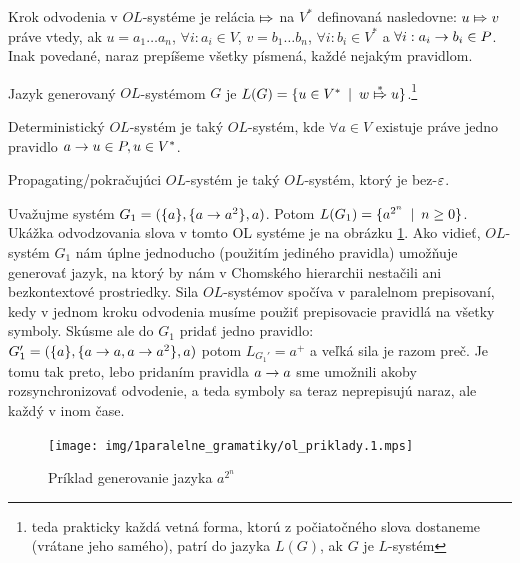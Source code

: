 \begin{definicia}
    Krok odvodenia v $OL$-systéme je relácia $\Mapsto$ na $V^{*}$ definovaná
    nasledovne: $u\Mapsto v$ práve vtedy, ak $u=a_{1} \dots a_{n}$,
    $\forall i: a_{i} \in V$, $v=b_{1} \dots b_{n}$, 
    $\forall i: b_{i} \in V^{*}$ a 
    $\forall i: a_{i} \rightarrow b_{i} \in P$. 
    Inak povedané, naraz prepíšeme všetky písmená, každé nejakým
    pravidlom.
\end{definicia}

\begin{definicia}
    Jazyk generovaný $OL$-systémom $G$ je 
    $L(G)=\{u\in V^{*} \enspace |\enspace w \overset{*}{\Mapsto} u\}$.\footnote{teda prakticky
        každá vetná forma, ktorú z
        počiatočného slova dostaneme (vrátane jeho samého), patrí do
        jazyka $L(G)$, ak $G$ je $L$-systém
        }
\end{definicia}

\begin{definicia}
    Deterministický $OL$-systém je taký $OL$-systém,
    kde $\forall a\in V$ existuje práve jedno pravidlo
    $a \rightarrow u\in P, u\in V^*$.
\end{definicia}

\begin{definicia}
    Propagating/pokračujúci $OL$-systém je taký $OL$-systém, ktorý
    je bez-$\varepsilon$.
\end{definicia}

\begin{priklad}
    Uvažujme systém $G_1=(\{ a \},\{ a \rightarrow a^2\}, a)$.
    Potom $L(G_1)=\{ a^{2^n} \enspace |\enspace n \ge 0\}$.
    Ukážka odvodzovania slova v tomto OL systéme je na obrázku 
    \ref{img:ol_priklad_1}.
    Ako vidieť, $OL$-systém $G_1$ nám úplne jednoducho 
    (použitím jediného pravidla) umožňuje
    generovať jazyk, na ktorý by nám v Chomského hierarchii
    nestačili ani bezkontextové prostriedky.
    Sila $OL$-systémov spočíva v paralelnom prepisovaní,
    kedy v jednom kroku odvodenia
    musíme použiť prepisovacie pravidlá na všetky symboly.
    Skúsme ale do $G_1$ pridať jedno pravidlo:\\
    $G_{1}'=(\{ a \},\{ a\rightarrow a,
    a \rightarrow a^2 \}, a)$ potom $L_{G_1'}=a^{+}$ a veľká sila je razom
    preč. Je tomu tak preto, lebo pridaním pravidla $a\rightarrow a$ sme
    umožnili akoby rozsynchronizovať odvodenie, a teda symboly sa
    teraz neprepisujú naraz, ale každý v inom čase.

    \begin{figure}[htp]
        \centering
        \texttt{[image: img/1paralelne\_gramatiky/ol\_priklady.1.mps]}
        \caption{Príklad generovanie jazyka $a^{2^n}$}
        \label{img:ol_priklad_1}
    \end{figure}
\end{priklad}


